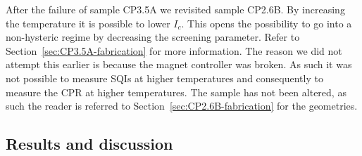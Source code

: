 After the failure of sample CP3.5A we revisited sample CP2.6B. By increasing the temperature it is possible to lower $I_c$. This opens the possibility to go into a non-hysteric regime by decreasing the screening parameter. Refer to Section~\ref{sec:CP3.5A-fabrication} for more information. The reason we did not attempt this earlier is because the magnet controller was broken. As such it was not possible to measure SQIs at higher temperatures and consequently to measure the CPR at higher temperatures. The sample has not been altered, as such the reader is referred to Section~\ref{sec:CP2.6B-fabrication} for the geometries.

\subsection{Results and discussion}
